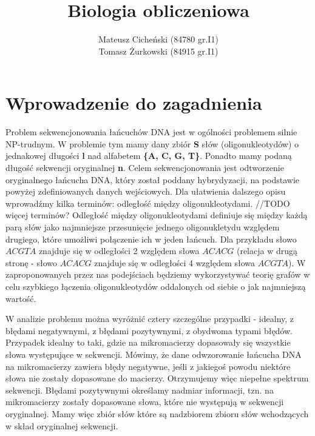 \documentclass[a4paper]{article}
\title{Biologia obliczeniowa}
\author{Mateusz Cicheński (84780 gr.I1) \\ Tomasz Żurkowski (84915 gr.I1)}
\begin{document}
\maketitle
\tableofcontents

\newpage

\section{Wprowadzenie do zagadnienia}

Problem sekwencjonowania łańcuchów DNA jest w ogólności problemem silnie NP-trudnym. W problemie tym mamy dany zbiór {\bf S} słów (oligonukleotydów) o jednakowej długości {\bf l} nad alfabetem {\bf \{A, C, G, T\}}. Ponadto mamy podaną długość sekwencji oryginalnej {\bf n}. Celem sekwencjonowania jest odtworzenie oryginalnego łańcucha DNA, który został poddany hybrydyzacji, na podstawie powyżej zdefiniowanych danych wejściowych.
Dla ułatwienia dalszego opisu wprowadźmy kilka terminów: odległość między oligonukleotydami.
//TODO więcej terminów?
Odległość między oligonukleotydami definiuje się między każdą parą słów jako najmniejsze przesunięcie jednego oligonukletydu względem drugiego, które umożliwi połączenie ich w jeden łańcuch. Dla przykładu słowo $ACGTA$ znajduje się w odległości 2 względem słowa $ACACG$ (relacja w drugą stronę - słowo $ACACG$ znajduje się w odległości 4 względem słowa $ACGTA$).
W zaproponowanych przez nas podejściach będziemy wykorzystywać teorię grafów w celu szybkiego łączenia oligonukleotydów oddalonych od siebie o jak najmniejszą wartość.

W analizie problemu można wyróżnić cztery szczególne przypadki - idealny, z błędami negatywnymi, z błędami pozytywnymi, z obydwoma typami błędów.
Przypadek idealny to taki, gdzie na mikromacierzy dopasowały się wszystkie słowa występujące w sekwencji.
Mówimy, że dane odwzorowanie łańcucha DNA na mikromacierzy zawiera błędy negatywne, jeśli z jakiegoś powodu niektóre słowa nie zostały dopasowane do macierzy. Otrzymujemy więc niepełne spektrum sekwencji.
Błędami pozytywnymi określamy nadmiar informacji, tzn. na mikromacierzy zostały dopasowane słowa, które nie występują w sekwencji oryginalnej. Mamy więc zbiór słów które są nadzbiorem zbioru słów wchodzących w skład oryginalnej sekwencji.
\end{document}
